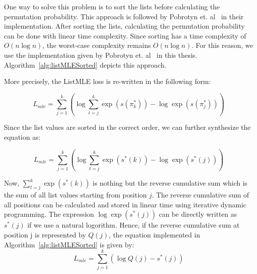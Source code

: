 \documentclass[12pt, twoside, ngerman]{report}
\begin{document}
One way to solve this problem is to sort the lists before calculating the permutation probability.
This approach is followed by Pobrotyn
 et. al~\cite{Pobrotyn2020ContextAwareLT} in their implementation.
After sorting the lists, calculating the permutation probability can be done with linear time complexity. Since sorting has a time complexity of $O(n \log n)$, the worst-case complexity remains $O(n \log n)$.
For this reason, we use the implementation given by Pobrotyn
 et. al~\cite{Pobrotyn2020ContextAwareLT} in this thesis.
Algorithm~\ref{alg:listMLESorted} depicts this approach.


More precisely, the ListMLE loss is re-written in the following form:

\begin{equation}
L_{mle} = \sum\limits_{j=1}^{k} \left( \log \sum\limits_{t=j}^k \exp(s(\pi^*_k)) - \log \exp(s(\pi^*_j)) \right)
\end{equation}

Since the list values are sorted in the correct order, we can further synthesize the equation as:

\begin{equation}
L_{mle} = \sum\limits_{j=1}^{k} \left( \log \sum\limits_{t=j}^k \exp(s^*(k)) - \log \exp(s^*(j)) \right)
\end{equation}

Now, $\sum\limits_{t=j}^k \exp(s^*(k))$ is nothing but the reverse cumulative sum which is the sum of all list values starting from position $j$.
The reverse cumulative sum of all positions can be calculated and stored in linear time using iterative dynamic programming.
The expression $\log \exp(s^*(j))$ can be directly written as $s^*(j)$ if we use a natural logorithm.
Hence, if the reverse cumulative sum at position j is represented by $Q(j)$,  the equation implemented in Algorithm~\ref{alg:listMLESorted} is given by:
\begin{equation}\label{eq:sortedListMLEequation}
L_{mle} = \sum\limits_{j=1}^{k} \left( \log Q(j) - s^*(j) \right)
\end{equation}
\end{document}
